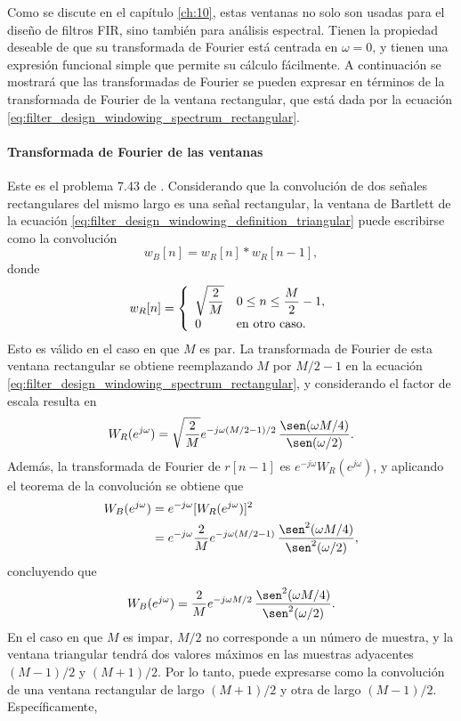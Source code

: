 \documentclass[a4paper]{report}
\begin{document}
Como se discute en el capítulo \ref{ch:10}, estas ventanas no solo son usadas para el diseño de filtros FIR, sino también para análisis espectral. Tienen la propiedad deseable de que su transformada de Fourier está centrada en \(\omega=0\), y tienen una expresión funcional simple que permite su cálculo fácilmente. A continuación se mostrará que las transformadas de Fourier se pueden expresar en términos de la transformada de Fourier de la ventana rectangular, que está dada por la ecuación \ref{eq:filter_design_windowing_spectrum_rectangular}.

\paragraph{Transformada de Fourier de las ventanas} Este es el problema 7.43 de \cite{oppenheim2009discrete}. Considerando que la convolución de dos señales rectangulares del mismo largo es una señal rectangular, la ventana de Bartlett de la ecuación \ref{eq:filter_design_windowing_definition_triangular} puede escribirse como la convolución
\[
 w_B[n]=w_R[n]*w_R[n-1],
\]
donde
\[
 w_R[n]=\left\{ 
   \begin{array}{ll}
     \sqrt{\dfrac{2}{M}} & 0\leq n\leq \dfrac{M}{2}-1,\\[\medskipamount] 
     0 & \textrm{en otro caso.}
   \end{array}
   \right.
\]
Esto es válido en el caso en que \(M\) es par. La transformada de Fourier de esta ventana rectangular se obtiene reemplazando \(M\) por \(M/2-1\) en la ecuación \ref{eq:filter_design_windowing_spectrum_rectangular}, y considerando el factor de escala resulta en
\[
 W_R(e^{j\omega})=\sqrt{\dfrac{2}{M}}e^{-j\omega (M/2-1)/2}\,\frac{\sen(\omega M/4)}{\sen(\omega/2)}.
\]
Además, la transformada de Fourier de \(r[n-1]\) es \(e^{-j\omega}W_R(e^{j\omega})\), y aplicando el teorema de la convolución se obtiene que 
\begin{align*}
 W_B(e^{j\omega})&=e^{-j\omega}[W_R(e^{j\omega})]^2\\
  &=e^{-j\omega}\dfrac{2}{M}e^{-j\omega (M/2-1)}\,\frac{\sen^2(\omega M/4)}{\sen^2(\omega/2)},
\end{align*}
concluyendo que 
\begin{equation}\label{eq:filter_design_windowing_spectrum_bartlett_even}
 W_B(e^{j\omega})=\dfrac{2}{M}e^{-j\omega M/2}\,\frac{\sen^2(\omega M/4)}{\sen^2(\omega/2)}.
\end{equation}
En el caso en que \(M\) es impar, \(M/2\) no corresponde a un número de muestra, y la ventana triangular tendrá dos valores máximos en las muestras adyacentes \((M-1)/2\) y \((M+1)/2\). Por lo tanto, puede expresarse como la convolución de una ventana rectangular de largo \((M+1)/2\) y otra de largo \((M-1)/2\). Específicamente,
\end{document}
